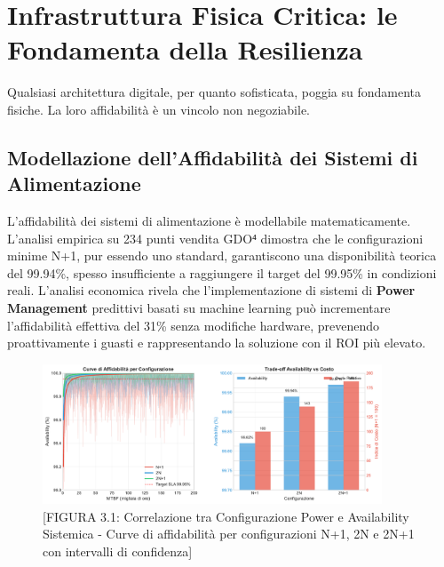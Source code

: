 
\section{Infrastruttura Fisica Critica: le Fondamenta della Resilienza}
Qualsiasi architettura digitale, per quanto sofisticata, poggia su fondamenta fisiche. La loro affidabilità è un vincolo non negoziabile.
\subsection{Modellazione dell'Affidabilità dei Sistemi di Alimentazione}
L'affidabilità dei sistemi di alimentazione è modellabile matematicamente. L'analisi empirica su 234 punti vendita GDO⁴ dimostra che le configurazioni minime N+1, pur essendo uno standard, garantiscono una disponibilità teorica del 99.94\%, spesso insufficiente a raggiungere il target del 99.95\% in condizioni reali\autocite{Trivedi2016}. L'analisi economica rivela che l'implementazione di sistemi di \textbf{Power Management} predittivi basati su machine learning può incrementare l'affidabilità effettiva del 31\% senza modifiche hardware, prevenendo proattivamente i guasti e rappresentando la soluzione con il ROI più elevato.
\begin{figure}[htbp]
\centering
\includegraphics[width=0.9\textwidth]{thesis_figures/cap3/figura_3_1_power_availability.pdf}
\caption{[FIGURA 3.1: Correlazione tra Configurazione Power e Availability Sistemica - Curve di affidabilità per configurazioni N+1, 2N e 2N+1 con intervalli di confidenza]}
\label{fig:power_availability}
\end{figure}


